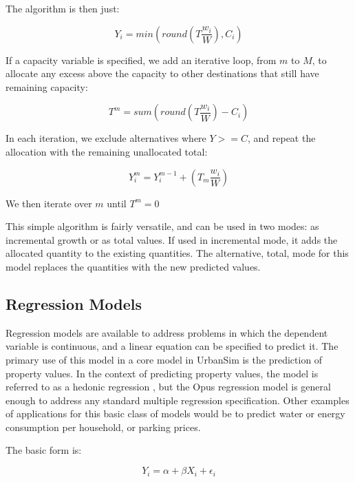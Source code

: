 The algorithm is then just:

\begin{equation}
Y_i = min(round(T\frac{w_i}{W}),C_i)
\end{equation}

If a capacity variable is specified, we add an iterative loop, from $m$ to $M$, to allocate any excess above the capacity to other destinations that still have remaining capacity:

\begin{equation}
T^m = sum(round(T\frac{w_i}{W}) - C_i)
\end{equation}

In each iteration, we exclude alternatives where $Y>=C$, and repeat the allocation with the remaining unallocated total:

\begin{equation}
Y^m_i = Y^{m-1}_i + (T_m\frac{w_i}{W})
\end{equation}

We then iterate over $m$ until $T^m = 0$ 

This simple algorithm is fairly versatile, and can be used in two modes: as incremental growth or as total values. If used in incremental mode, it adds the allocated quantity to the existing quantities.  The alternative, total, mode for this model replaces the quantities with the new predicted values.

\subsection{Regression Models}

Regression models are available to address problems in which the dependent variable is continuous, and a linear equation can be specified to predict it.  The primary use of this model in a core model in UrbanSim is the prediction of property values.  In the context of predicting property values, the model is referred to as a hedonic regression \cite{waddell-hedonic-1993}, but the Opus regression model is general enough to address any standard multiple regression specification.  Other examples of applications for this basic class of models would be to predict water or energy consumption per household, or parking prices.

The basic form is:

\begin{equation}
Y_i = \alpha + \beta X_i + \epsilon_i
\end{equation}

